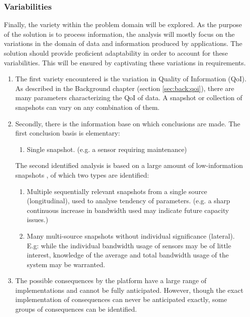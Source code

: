 \subsubsection*{Variabilities}
Finally, the variety within the problem domain will be explored. As the purpose of the solution is to process information, the analysis will mostly focus on the variations in the domain of data and information produced by applications. The solution should provide proficient adaptability in order to account for these variabilities. This will be ensured by captivating these variations in requirements.
\begin{enumerate}[label=V\archid .\arabic*]
\nospace
\item \label{v:qoi} The first variety  encountered is the variation in Quality of Information (QoI). As described in the Background chapter (section \ref{sec:back:qoi}), there are many parameters characterizing the QoI of data. A snapshot or collection of snapshots can vary on any combination of them.
\item \label{v:conclusion_basis} Secondly, there is the information base on which conclusions are made. The first conclusion basis is elementary:
\begin{enumerate}
\nospace
\item Single snapshot. (e.g. a sensor requiring maintenance)
\end{enumerate}
The second identified analysis is based on a large amount of low-information snapshots \cite{qos_difficult}, of which two types are identified:
\begin{enumerate}[resume]
\item Multiple sequentially relevant snapshots from a single source (longitudinal), used to analyse tendency of parameters. (e.g. a sharp continuous increase in bandwidth used may indicate future capacity issues.)
\item Many multi-source snapshots without individual significance (lateral). E.g: while the individual bandwidth usage of sensors may be of little interest, knowledge of the average and total bandwidth usage of the system may be warranted.
\end{enumerate}
\item \label{v:consequence} The possible consequences by the platform have a large range of implementations and cannot be fully anticipated. However, though the exact implementation of consequences can never be anticipated exactly, some groups of consequences can be identified.
\begin{enumerate}

\end{enumerate}
\end{enumerate}
